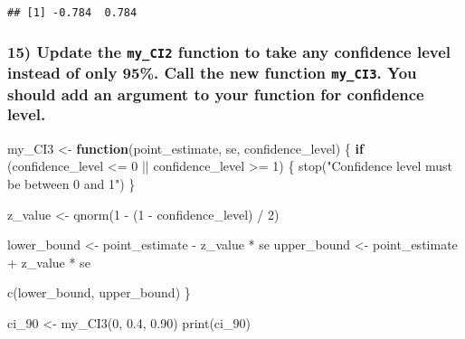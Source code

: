 \documentclass[
  12pt,
]{article}
\newenvironment{Shaded}{\begin{snugshade}}{\end{snugshade}}
\newcommand{\ControlFlowTok}[1]{\textcolor[rgb]{0.13,0.29,0.53}{\textbf{#1}}}
\newcommand{\DecValTok}[1]{\textcolor[rgb]{0.00,0.00,0.81}{#1}}
\newcommand{\FloatTok}[1]{\textcolor[rgb]{0.00,0.00,0.81}{#1}}
\newcommand{\FunctionTok}[1]{\textcolor[rgb]{0.00,0.00,0.00}{#1}}
\newcommand{\NormalTok}[1]{#1}
\newcommand{\OtherTok}[1]{\textcolor[rgb]{0.56,0.35,0.01}{#1}}
\newcommand{\SpecialCharTok}[1]{\textcolor[rgb]{0.00,0.00,0.00}{#1}}
\newcommand{\StringTok}[1]{\textcolor[rgb]{0.31,0.60,0.02}{#1}}
\begin{document}
\begin{verbatim}
## [1] -0.784  0.784
\end{verbatim}

\hypertarget{update-the-my_ci2-function-to-take-any-confidence-level-instead-of-only-95.-call-the-new-function-my_ci3.-you-should-add-an-argument-to-your-function-for-confidence-level.}{%
\subsubsection{\texorpdfstring{15) Update the \texttt{my\_CI2} function
to take any confidence level instead of only 95\%. Call the new function
\texttt{my\_CI3}. You should add an argument to your function for
confidence
level.}{15) Update the my\_CI2 function to take any confidence level instead of only 95\%. Call the new function my\_CI3. You should add an argument to your function for confidence level.}}\label{update-the-my_ci2-function-to-take-any-confidence-level-instead-of-only-95.-call-the-new-function-my_ci3.-you-should-add-an-argument-to-your-function-for-confidence-level.}}

\begin{Shaded}
\begin{Highlighting}[]
\NormalTok{my\_CI3 }\OtherTok{\textless{}{-}} \ControlFlowTok{function}\NormalTok{(point\_estimate, se, confidence\_level) \{}
  \ControlFlowTok{if}\NormalTok{ (confidence\_level }\SpecialCharTok{\textless{}=} \DecValTok{0} \SpecialCharTok{||}\NormalTok{ confidence\_level }\SpecialCharTok{\textgreater{}=} \DecValTok{1}\NormalTok{) \{}
    \FunctionTok{stop}\NormalTok{(}\StringTok{"Confidence level must be between 0 and 1"}\NormalTok{)}
\NormalTok{  \}}
  
\NormalTok{  z\_value }\OtherTok{\textless{}{-}} \FunctionTok{qnorm}\NormalTok{(}\DecValTok{1} \SpecialCharTok{{-}}\NormalTok{ (}\DecValTok{1} \SpecialCharTok{{-}}\NormalTok{ confidence\_level) }\SpecialCharTok{/} \DecValTok{2}\NormalTok{)}
  
\NormalTok{  lower\_bound }\OtherTok{\textless{}{-}}\NormalTok{ point\_estimate }\SpecialCharTok{{-}}\NormalTok{ z\_value }\SpecialCharTok{*}\NormalTok{ se}
\NormalTok{  upper\_bound }\OtherTok{\textless{}{-}}\NormalTok{ point\_estimate }\SpecialCharTok{+}\NormalTok{ z\_value }\SpecialCharTok{*}\NormalTok{ se}
  
  \FunctionTok{c}\NormalTok{(lower\_bound, upper\_bound)}
\NormalTok{\}}

\NormalTok{ci\_90 }\OtherTok{\textless{}{-}} \FunctionTok{my\_CI3}\NormalTok{(}\DecValTok{0}\NormalTok{, }\FloatTok{0.4}\NormalTok{, }\FloatTok{0.90}\NormalTok{)}
\FunctionTok{print}\NormalTok{(ci\_90)}
\end{Highlighting}
\end{Shaded}
\end{document}
